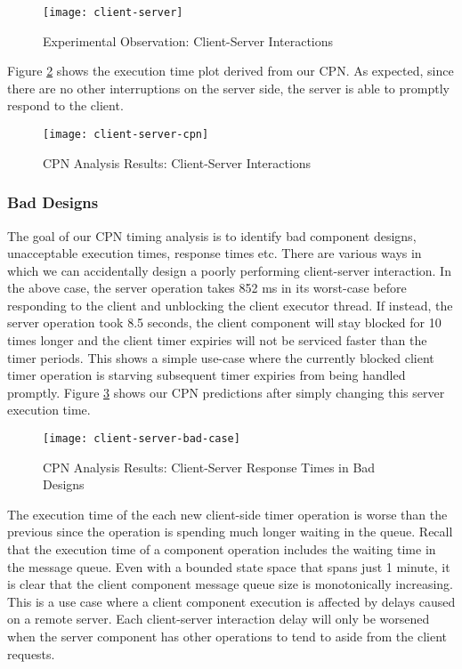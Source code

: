 \begin{figure}[h]
	\centering
	\texttt{[image: client-server]}
	\caption{Experimental Observation: Client-Server Interactions}
	\label{fig:client-server}
\end{figure}
\FloatBarrier

Figure \ref{fig:client-server-cpn} shows the execution time plot derived from our CPN. As expected, since there are no other interruptions on the server side, the server is able to promptly respond to the client.

\begin{figure}[h]
	\centering
	\texttt{[image: client-server-cpn]}
	\caption{CPN Analysis Results: Client-Server Interactions}
	\label{fig:client-server-cpn}
\end{figure}
\FloatBarrier

\subsubsection{Bad Designs}

The goal of our CPN timing analysis is to identify bad component designs, unacceptable execution times, response times etc. There are various ways in which we can accidentally design a poorly performing client-server interaction. In the above case, the server operation takes 852 ms in its worst-case before responding to the client and unblocking the client executor thread. If instead, the server operation took 8.5 seconds, the client component will stay blocked for 10 times longer and the client timer expiries will not be serviced faster than the timer periods. This shows a simple use-case where the currently blocked client timer operation is starving subsequent timer expiries from being handled promptly. Figure \ref{fig:client-server-bad-case} shows our CPN predictions after simply changing this server execution time. 

\begin{figure}[h]
	\centering
	\texttt{[image: client-server-bad-case]}
	\caption{CPN Analysis Results: Client-Server Response Times in Bad Designs}
	\label{fig:client-server-bad-case}
\end{figure}
\FloatBarrier

The execution time of the each new client-side timer operation is worse than the previous since the operation is spending much longer waiting in the queue. Recall that the execution time of a component operation includes the waiting time in the message queue. Even with a bounded state space that spans just 1 minute, it is clear that the client component message queue size is monotonically increasing. This is a use case where a client component execution is affected by delays caused on a remote server. Each client-server interaction delay will only be worsened when the server component has other operations to tend to aside from the client requests. 

